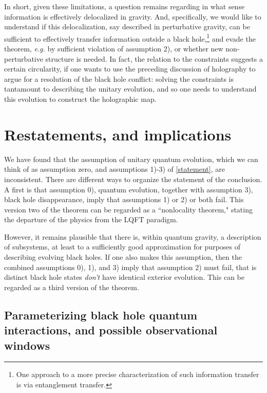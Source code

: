 \documentclass[11pt]{article}
\numberwithin{equation}{section}
\begin{document}
In short, given these limitations, a question remains regarding in what sense information is effectively delocalized in gravity.  And, specifically, we would like to understand if this delocalization, say described in perturbative gravity, can be sufficient to effectively transfer  information outside a black hole,\footnote{One approach to a more precise characterization of such information transfer is via entanglement transfer\cite{GiSh1,Sussxfer}.}
and evade the theorem, {\it e.g.} by sufficient violation of assumption 2), or whether new non-perturbative structure is needed.  In fact, the relation to the constraints suggests a certain circularity, if one wants to use the preceding discussion of holography to argue for a resolution of the black hole conflict: solving the constraints is tantamount to describing the unitary evolution, and so one needs to understand this evolution to construct the holographic map\cite{HoUn}.

\section{Restatements, and implications}

We have found that the assumption of unitary quantum evolution, which we can think of as assumption zero, and assumptions 1)-3) of 
\ref{statement}, are inconsistent.  There are different ways to organize the statement of the conclusion.  A first is that assumption 0), quantum evolution, together with assumption 3), black hole disappearance, imply that assumptions 1) or 2) or both fail.  This version two of the theorem 
can be regarded as a ``nonlocality theorem," stating the departure of the physics from the LQFT paradigm.

However, it remains plausible that there is, within quantum gravity, a description of subsystems, at least to a sufficiently good approximation for purposes of describing evolving black holes.  If one also makes this assumption, then the combined assumptions 0), 1), and 3) imply that assumption 2) must fail, that is distinct black hole states {\it don't} have identical exterior evolution.  This can be regarded as a third version of the theorem.

\subsection{Parameterizing black hole quantum interactions, and possible observational windows}
\end{document}
